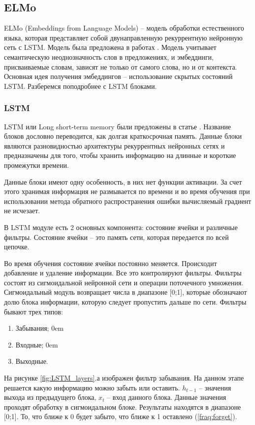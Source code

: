 \documentclass[a4paper,14pt]{article}
\begin{document}
\subsection{ELMo}

ELMo (Embeddings from Language Models) -- модель обработки естественного языка, которая представляет собой двунаправленную рекуррентную нейронную сеть с LSTM.
Модель была предложена в работах \cite{elmo1,elmo2,elmo3}.
Модель учитывает семантическую неоднозначность слов в предложениях, и эмбеддинги, присваиваемые словам, зависят не только от самого слова, но и от контекста.
Основная идея получения эмбеддингов -- использование скрытых состояний LSTM.
Разберемся поподробнее с LSTM блоками.

\subsubsection{LSTM}

LSTM или Long short-term memory были предложены в статье \cite{lstm}.
Название блоков дословно переводится, как долгая краткосрочная память.
Данные блоки являются разновидностью архитектуры рекуррентных нейронных сетях и предназначены для того, чтобы хранить информацию на длинные и короткие промежутки времени.

Данные блоки имеют одну особенность, в них нет функции активации.
За счет этого хранимая информация не размывается по времени и во время обучения при использовании метода обратного распространения ошибки вычисляемый градиент не исчезает.

В LSTM модуле есть 2 основных компонента: состояние ячейки и различные фильтры.
Состояние ячейки -- это память сети, которая передается по всей цепочке.

Во время обучения состояние ячейки постоянно меняется. Происходит добавление и удаление информации.
Все это контролируют фильтры.
Фильтры состоят из сигмоидальной нейронной сети и операции поточечного умножения.
Сигмоидальный модуль возвращает числа в диапазоне [0;1], которые обозначают долю блока информации, которую следует пропустить дальше по сети.
Фильтры бывают трех типов:
\begin{enumerate}
	\itemsep0em 
	\item Забывания;
	\itemsep0em 
	\item Входные;
	\itemsep0em 
	\item Выходные.
\end{enumerate}

На рисунке \ref{fig:LSTM_layers}.а изображен фильтр забывания.
На данном этапе решается какую информацию можно забыть или оставить.
$h_{t-1}$ -- значения выхода из предыдущего блока, $x_t$ -- вход данного блока.
Данные значения проходят обработку в сигмоидальном блоке.
Результаты находятся в диапазоне [0;1].
То, что ближе к 0 будет забыто, что ближе к 1 оставлено (\ref{fraq:forget}).
\end{document}
